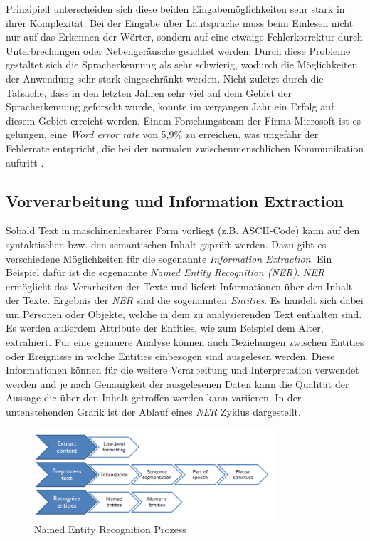 Prinzipiell unterscheiden sich diese beiden Eingabemöglichkeiten sehr stark in ihrer Komplexität. Bei der Eingabe über Lautsprache muss beim Einlesen nicht nur auf das Erkennen der Wörter, sondern auf eine etwaige Fehlerkorrektur durch Unterbrechungen oder Nebengeräusche geachtet werden. Durch diese Probleme gestaltet sich die Spracherkennung als sehr schwierig, wodurch die Möglichkeiten der Anwendung sehr stark eingeschränkt werden. Nicht zuletzt durch die Tatsache, dass in den letzten Jahren sehr viel auf dem Gebiet der Spracherkennung geforscht wurde, konnte im vergangen Jahr ein Erfolg auf diesem Gebiet erreicht werden. Einem Forschungsteam der Firma Microsoft ist es gelungen, eine \textit{Word error rate} von 5,9\% zu erreichen, was ungefähr der Fehlerrate entspricht, die bei der normalen zwischenmenschlichen Kommunikation auftritt \cite{Xiong2016}. 

\subsection{Vorverarbeitung und Information Extraction}
Sobald Text in maschinenlesbarer Form vorliegt (z.B. ASCII-Code) kann auf den syntaktischen bzw. den semantischen Inhalt geprüft werden. Dazu gibt es verschiedene Möglichkeiten für die sogenannte \textit{Information Extraction}. Ein Beispiel dafür ist die sogenannte \textit{Named Entity Recognition (NER)}. \textit{NER} ermöglicht das Verarbeiten der Texte und liefert Informationen über den Inhalt der Texte. Ergebnis der \textit{NER} sind die sogenannten \textit{Entities}. Es handelt sich dabei um Personen oder Objekte, welche in dem zu analysierenden Text enthalten sind. Es werden außerdem Attribute der Entities, wie zum Beispiel dem Alter, extrahiert. Für eine genauere Analyse können auch Beziehungen zwischen Entities oder Ereignisse in welche Entities einbezogen sind ausgelesen werden. Diese Informationen können für die weitere Verarbeitung und Interpretation verwendet werden und je nach Genauigkeit der ausgelesenen Daten kann die Qualität der Aussage die über den Inhalt getroffen werden kann variieren. In der untenstehenden Grafik ist der Ablauf eines \textit{NER} Zyklus dargestellt.

\begin{figure}[ht]
	\centering
		\includegraphics[width=0.80\textwidth]{images/ner-pipeline.PNG}
	\caption{Named Entity Recognition Prozess}
	\label{fig:ner-pipeline}
\end{figure}

